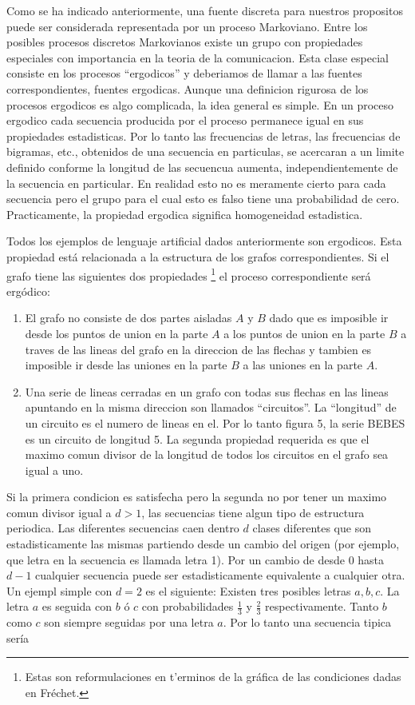 Como se ha indicado anteriormente, una fuente discreta para nuestros
propositos puede ser considerada representada por un proceso
Markoviano. Entre los posibles procesos discretos Markovianos existe
un grupo con propiedades especiales con importancia en la teoria de la
comunicacion. Esta clase especial consiste en los procesos
``ergodicos'' y deberiamos de llamar a las fuentes correspondientes,
fuentes ergodicas. Aunque una definicion rigurosa de los procesos
ergodicos es algo complicada, la idea general es simple. En un proceso
ergodico cada secuencia producida por el proceso permanece igual en
sus propiedades estadisticas. Por lo tanto las frecuencias de letras,
las frecuencias de bigramas, etc., obtenidos de una secuencia en
particulas, se acercaran a un limite definido conforme la longitud de
las secuencua aumenta, independientemente de la secuencia en
particular. En realidad esto no es meramente cierto para cada
secuencia pero el grupo para el cual esto es falso tiene una
probabilidad de cero. Practicamente, la propiedad ergodica significa
homogeneidad estadistica.

Todos los ejemplos de lenguaje artificial dados anteriormente son
ergodicos. Esta propiedad est\'{a} relacionada a la estructura de los
grafos correspondientes. Si el grafo tiene las siguientes dos
propiedades \footnote{Estas son reformulaciones en t'{e}rminos de la gr\'{a}fica de las condiciones dadas en Fr\'{e}chet.} el proceso correspondiente ser\'{a} erg\'{o}dico:

\begin{enumerate}
  \item El grafo no consiste de dos partes aisladas $A$ y $B$ dado que es
   imposible ir desde los puntos de union en la parte $A$ a los puntos
   de union en la parte $B$ a traves de las lineas del grafo en la
   direccion de las flechas y tambien es imposible ir desde las
   uniones en la parte $B$ a las uniones en la parte $A$.
 \item Una serie de lineas cerradas en un grafo con todas sus flechas en las lineas
   apuntando en la misma direccion son llamados ``circuitos''.
   La ``longitud'' de un circuito es el numero de lineas en el.
   Por lo tanto figura 5, la serie BEBES es un circuito de longitud 5.
   La segunda propiedad requerida es que el maximo comun divisor
   de la longitud de todos los circuitos en el grafo sea igual a uno.
\end{enumerate}


Si la primera condicion es satisfecha pero la segunda no por tener
un maximo comun divisor igual a $d > 1$, las secuencias tiene algun tipo
de estructura periodica. Las diferentes secuencias caen dentro $d$ clases diferentes
que son estadisticamente las mismas partiendo desde un cambio
del origen (por ejemplo, que letra en la secuencia es llamada letra 1). Por un cambio
de desde $0$ hasta $d - 1$ cualquier secuencia puede ser
estadisticamente equivalente a cualquier otra. Un ejempl simple
con $d = 2$ es el siguiente: Existen tres posibles letras $a, b , c$.
La letra $a$ es seguida con $b$ \'{o} $c$ con
probabilidades $\frac{1}{3}$ y $\frac{2}{3}$ respectivamente.
Tanto $b$ como $c$ son siempre seguidas por una letra $a$. Por lo tanto una
secuencia tipica ser\'{i}a

